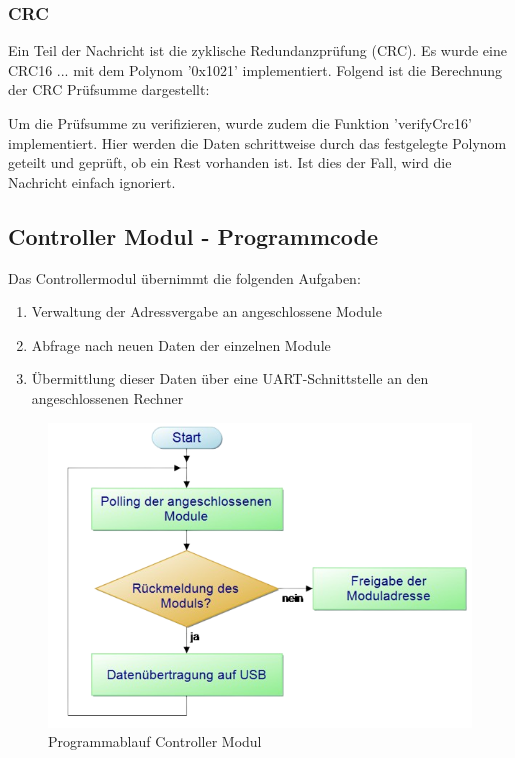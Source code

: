 \subsubsection{CRC}
Ein Teil der Nachricht ist die zyklische Redundanzprüfung (CRC). Es wurde eine CRC16 ... mit dem Polynom '0x1021' implementiert. Folgend ist die Berechnung der CRC Prüfsumme dargestellt:



Um die Prüfsumme zu verifizieren, wurde zudem die Funktion 'verifyCrc16' implementiert. Hier werden die Daten schrittweise durch das festgelegte Polynom geteilt und geprüft, ob ein Rest vorhanden ist. Ist dies der Fall, wird die Nachricht einfach ignoriert.



\newpage
\subsection{Controller Modul - Programmcode}
Das Controllermodul übernimmt die folgenden Aufgaben:
\begin{enumerate}
	\item Verwaltung der Adressvergabe an angeschlossene Module
	\item Abfrage nach neuen Daten der einzelnen Module
	\item Übermittlung dieser Daten über eine UART-Schnittstelle an den angeschlossenen Rechner
\end{enumerate}

\begin{figure}[H]
	\centering    
	\includegraphics[width=.75\textwidth]{Bilder/pap_hauptmodul.png}
	\caption{Programmablauf Controller Modul}
	\label{Programm_Controller Modul}
\end{figure}
\textmd{
}

